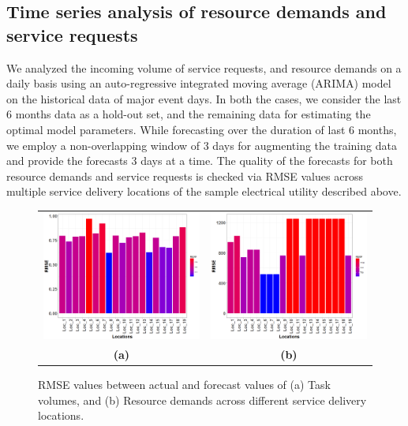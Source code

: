 \documentclass[twoside,leqno,twocolumn]{article}
\begin{document}
\subsection{Time series analysis of resource demands and service requests}\label{subsec:timeseries}
We analyzed the incoming volume of service requests, and resource demands on a daily basis using an auto-regressive integrated moving average (ARIMA) model on the historical data of major event days. In both the cases, we consider the last 6 months data as a hold-out set, and the remaining data for estimating the optimal model parameters. While forecasting over the duration of last 6 months, we employ a non-overlapping window of 3 days for augmenting the training data and provide the forecasts 3 days at a time. The quality of the forecasts for both resource demands and service requests is checked via RMSE values across multiple service delivery locations of the sample electrical utility described above.
\begin{figure}
\centering
\begin{tabular}{cc}
 \includegraphics[width=8cm]{RMSE_bar_plots_outage.png} &
 \includegraphics[width=8cm]{RMSE_bar_plots_combined_demand.png}\\
{\Large \bf(a)} & {\Large \bf(b)}\\
\end{tabular}
\caption{RMSE values between actual and forecast values of (a) Task volumes, and (b) Resource demands across different service delivery locations.}
\label{fig4a}
\end{figure}
\end{document}
